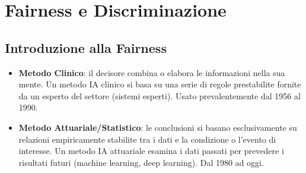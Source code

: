 \documentclass[a4paper,11pt]{article}
\begin{document}
\section{Fairness e Discriminazione}

\subsection{Introduzione alla Fairness}

\begin{definizione}
\begin{itemize}
  \item \textbf{Metodo Clinico}: il decisore combina o elabora le informazioni nella sua mente. Un metodo IA clinico si basa su una serie di regole prestabilite fornite da un esperto del settore (sistemi esperti). Usato prevalentemente dal 1956 al 1990.
  \item \textbf{Metodo Attuariale/Statistico}: le conclusioni si basano esclusivamente su relazioni empiricamente stabilite tra i dati e la condizione o l'evento di interesse. Un metodo IA attuariale esamina i dati passati per prevedere i risultati futuri (machine learning, deep learning). Dal 1980 ad oggi.
\end{itemize}
\end{definizione}
\end{document}
